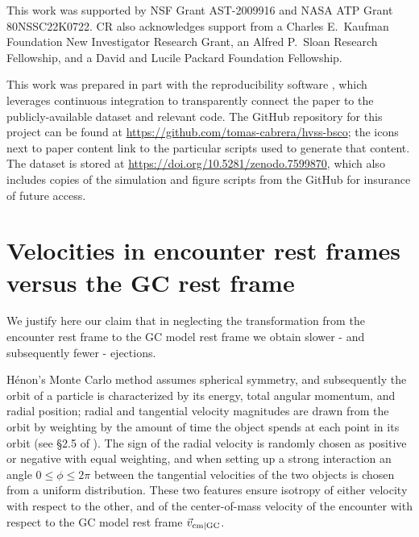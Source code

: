 \documentclass[twocolumn]{aastex631}
\newcommand{\CMC}{\texttt{CMC}}
\newcommand{\fewbody}{\texttt{Fewbody}}
\begin{document}
\begin{acknowledgements}
This work was supported by NSF Grant AST-2009916 and NASA ATP Grant 80NSSC22K0722.
CR also acknowledges support from a Charles E.~Kaufman Foundation New Investigator Research Grant, an Alfred P.~Sloan Research Fellowship, and a David and Lucile Packard Foundation Fellowship.
\end{acknowledgements}

\software{\CMC\ \citep{2000ApJ...540..969J, 2013ApJS..204...15P, Rodriguez2022}, \fewbody \citep{2004MNRAS.352....1F}, \texttt{galpy} \citep{2015ApJS..216...29B}, \texttt{astropy} \citep{2013A&A...558A..33A, 2018AJ....156..123A, 2022ApJ...935..167A}, \texttt{numpy} \citep{harris2020array}, \texttt{pandas} \citep{mckinney-proc-scipy-2010, reback2020pandas}, \texttt{matplotlib} \citep{Hunter:2007}}

This work was prepared in part with the reproducibility software \href{https://github.com/showyourwork/showyourwork}{\showyourwork}\citep{2021arXiv211006271L}, which leverages continuous integration to transparently connect the paper to the publicly-available dataset and relevant code.
The GitHub repository for this project can be found at \url{https://github.com/tomas-cabrera/hvss-bsco}; the icons next to paper content link to the particular scripts used to generate that content.
The dataset is stored at \url{https://doi.org/10.5281/zenodo.7599870}, which also includes copies of the simulation and figure scripts from the GitHub for insurance of future access.

\appendix

\section{Velocities in encounter rest frames versus the GC rest frame} \label{app:restframe}

We justify here our claim that in neglecting the transformation from the encounter rest frame to the GC model rest frame we obtain slower - and subsequently fewer - ejections.

H\'enon's Monte Carlo method assumes spherical symmetry, and subsequently the orbit of a particle is characterized by its energy, total angular momentum, and radial position; radial and tangential velocity magnitudes are drawn from the orbit by weighting by the amount of time the object spends at each point in its orbit (see \S2.5 of \citet{Rodriguez2022}).
The sign of the radial velocity is randomly chosen as positive or negative with equal weighting, and when setting up a strong interaction an angle $0 \le \phi \le 2\pi$ between the tangential velocities of the two objects is chosen from a uniform distribution.
These two features ensure isotropy of either velocity with respect to the other, and of the center-of-mass velocity of the encounter with respect to the GC model rest frame $\vec{v}_{\rm cm|GC}$.
\end{document}
